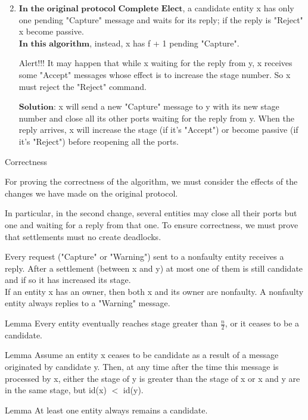 \documentclass{beamer}
\begin{document}
\begin{frame}
\small
\begin{enumerate}
\setcounter{enumi}{1}
\item $\textbf{In the original protocol Complete Elect}$, a candidate entity x has only one pending "Capture" message and waits for its reply; if the reply is "Reject" x become passive.\\ \medskip
$\textbf{In this algorithm}$, instead, x has f + 1 pending "Capture".
\medskip
\begin{alertblock}{Alert!!!}
It may happen that while x waiting for the reply from y, x receives some "Accept" messages whose effect is to increase the stage number. So x must reject the "Reject" command.
\end{alertblock}
\medskip $\textbf{Solution}$: x will send a new "Capture" message to y with its new stage number and close all its other ports waiting for the reply from y. When the reply arrives, x will increase the stage (if it's "Accept") or become passive (if it's "Reject") before reopening all the ports.
\end{enumerate}
\end{frame}

\begin{frame}{Correctness}
\small
\begin{flushleft}
For proving the correctness of the algorithm, we must consider the effects of the changes we have made on the original protocol.
\end{flushleft}
\begin{flushleft}
In particular, in the second change, several entities may close all their ports but one and waiting for a reply from that one. To ensure correctness, we must prove that settlements must no create deadlocks.
\end{flushleft}
\begin{flushleft}
Every request ("Capture" or "Warning") sent to a nonfaulty entity receives a reply. After a settlement (between x and y) at most one of them is still candidate and if so it has increased its stage.\\
If an entity x has an owner, then both x and its owner are nonfaulty. A nonfaulty entity always replies to a "Warning" message.
\end{flushleft}
\end{frame}

\begin{frame}
\begin{block}{Lemma}
Every entity eventually reaches stage greater than $\frac{n}{2}$, or it ceases to be a candidate.
\end{block}
\begin{block}{Lemma}
Assume an entity x ceases to be candidate as a result of a message originated by candidate y. Then, at any time after the time this message is processed by x, either the stage of y is greater than the stage of x or x and y are in the same stage, but id(x) $<$ id(y).
\end{block}
\begin{block}{Lemma}
At least one entity always remains a candidate.
\end{block}
\end{frame}
\end{document}
